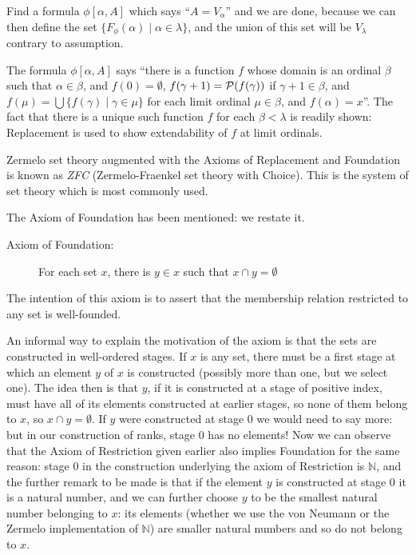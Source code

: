 \documentclass[12pt]{book}
\begin{document}
\begin{description}
Find a formula $\phi[\alpha,A]$ which says ``$A = V_{\alpha}$'' and we
are done, because we can then define the set $\{F_{\phi}(\alpha) \mid
\alpha \in \lambda\}$, and the union of this set will be $V_{\lambda}$
contrary to assumption.

The formula $\phi[\alpha,A]$ says ``there is a function $f$ whose
domain is an ordinal $\beta$ such that $\alpha \in \beta$, and $f(0) =
\emptyset$, $f(\gamma+1) = {\cal P}(f(\gamma))$ if $\gamma+1\in \beta$,
and $f(\mu) = \bigcup\{f(\gamma) \mid \gamma\in \mu\}$ for each limit
ordinal $\mu\in \beta$, and $f(\alpha) = x$''.  The fact that there is
a unique such function $f$ for each $\beta<\lambda$ is readily shown:
Replacement is used to show extendability of $f$ at limit ordinals.

\end{description}

Zermelo set theory augmented with the Axioms of Replacement and Foundation is known as
{\em ZFC\/} (Zermelo-Fraenkel set theory with Choice).  This is the system
of set theory which is most commonly used.

The Axiom of Foundation has been mentioned:  we restate it.

\begin{description}

\item[Axiom of Foundation:]  For each set $x$, there is $y \in x$ such that $x \cap y = \emptyset$

\end{description}

The intention of this axiom is to assert that the membership relation restricted to any set is well-founded.

An informal way to explain the motivation of the axiom is that the sets are constructed in well-ordered stages.  If $x$ is any set, there must be a first stage at which an element $y$ of $x$ is constructed (possibly more than one, but we select one).  The idea then is that $y$, if it is constructed at a stage of positive index, must have all of its elements constructed at earlier stages, so none of them belong to $x$, so $x \cap y = \emptyset$.  If $y$ were constructed at stage 0 we would need to say more:  but in our construction of ranks, stage 0 has no elements!  Now we can observe that the Axiom of Restriction given earlier also implies Foundation for the same reason:  stage 0 in the construction underlying the axiom of Restriction is $\mathbb N$, and the further remark to be made is that if the element $y$ is constructed at stage 0 it is a natural number, and we can further choose $y$ to be the smallest natural number belonging to $x$:  its elements (whether we use the von Neumann or the Zermelo implementation of $\mathbb N$) are smaller natural numbers and so do not belong to $x$.
\end{document}
